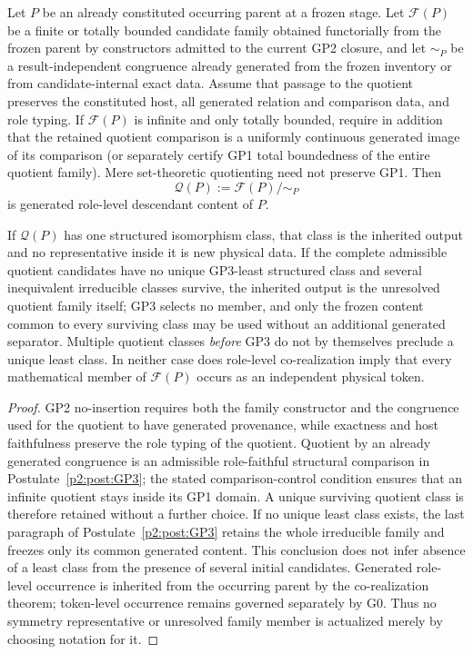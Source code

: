 \documentclass[12pt,a4paper]{article}
\begin{document}
\begin{corollary}
\label{p2:cor:generated-orbit-family-inheritance}
Let \(P\) be an already constituted occurring parent at a frozen stage.  Let
\(\mathcal F(P)\) be a finite or totally bounded candidate family obtained
functorially from the frozen parent by constructors admitted to the current
GP2 closure, and let \(\sim_P\) be a result-independent congruence already
generated from the frozen inventory or from candidate-internal exact data.
Assume that passage to the quotient preserves the constituted host, all
generated relation and comparison data, and role typing.  If $\mathcal F(P)$
is infinite and only totally bounded, require in addition that the retained
quotient comparison is a uniformly continuous generated image of its
comparison (or separately certify GP1 total boundedness of the entire
quotient family).  Mere set-theoretic quotienting need not preserve GP1.
Then
\[
 \mathcal Q(P):=\mathcal F(P)/{\sim_P}
\]
is generated role-level descendant content of \(P\).

If \(\mathcal Q(P)\) has one structured isomorphism class, that class is the
inherited output and no representative inside it is new physical data.  If the complete admissible quotient candidates have no unique GP3-least
structured class and several inequivalent irreducible classes survive, the
inherited output is the unresolved quotient family itself; GP3 selects no
member, and only the frozen content common to every surviving class may be
used without an additional generated separator.  Multiple quotient classes
\emph{before} GP3 do not by themselves preclude a unique least class.  In neither case does role-level co-realization imply
that every mathematical member of \(\mathcal F(P)\) occurs as an independent
physical token.
\end{corollary}

\begin{proof}
GP2 no-insertion requires both the family constructor and the congruence used
for the quotient to have generated provenance, while exactness and host
faithfulness preserve the role typing of the quotient.  Quotient by an
already generated congruence is an admissible role-faithful structural
comparison in Postulate~\ref{p2:post:GP3}; the stated comparison-control
condition ensures that an infinite quotient stays inside its GP1 domain.
A unique surviving quotient class is therefore retained without a further
choice.  If no unique least class exists, the last paragraph of
Postulate~\ref{p2:post:GP3} retains the whole irreducible family and
freezes only its common generated content.  This conclusion does not infer
absence of a least class from the presence of several initial candidates.  Generated
role-level occurrence is inherited from the occurring parent by the
co-realization theorem; token-level occurrence remains governed separately by
G0.  Thus no symmetry representative or unresolved family member is
actualized merely by choosing notation for it.
\end{proof}
\end{document}
